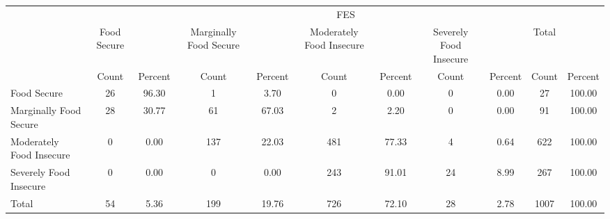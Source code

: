 {
\def\sym#1{\ifmmode^{#1}\else\(^{#1}\)\fi}
\begin{tabular}{l*{5}{cc}}
\hline\hline
            &\multicolumn{10}{c}{FES}                                                                                                         \\
            & Food Secure&            &Marginally Food Secure&            &Moderately Food Insecure&            &Severely Food Insecure&            &       Total&            \\
            &       Count&     Percent&       Count&     Percent&       Count&     Percent&       Count&     Percent&       Count&     Percent\\
\hline
Food Secure &          26&       96.30&           1&        3.70&           0&        0.00&           0&        0.00&          27&      100.00\\
Marginally Food Secure&          28&       30.77&          61&       67.03&           2&        2.20&           0&        0.00&          91&      100.00\\
Moderately Food Insecure&           0&        0.00&         137&       22.03&         481&       77.33&           4&        0.64&         622&      100.00\\
Severely Food Insecure&           0&        0.00&           0&        0.00&         243&       91.01&          24&        8.99&         267&      100.00\\
Total       &          54&        5.36&         199&       19.76&         726&       72.10&          28&        2.78&        1007&      100.00\\
\hline\hline
\end{tabular}
}
